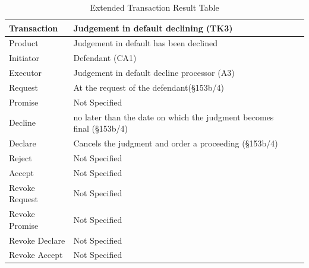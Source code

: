\begin{landscape}
\begin{table}[h]
\caption{Extended Transaction Result Table}
\label{tab:etrt}
\begin{tabular}{|l||l|l|}
\hline
Transaction  & Judgement in default declining (TK3)  \\ \hline
Product      & Judgement in default has been declined  \\ \hline
Initiator      &  Defendant (CA1)   \\ \hline
Executor       &  Judgement in default decline processor (A3) \\ \hline
Request        & At the request of the defendant(\S153b/4)   \\ \hline
Promise        &  Not Specified \\ \hline
Decline        &  no later than the date on which the judgment becomes final (\S153b/4) \\ \hline
Declare        & Cancels the judgment and order a proceeding (\S153b/4) \\ \hline
Reject         &  Not Specified   \\ \hline
Accept         & Not Specified \\ \hline
Revoke Request & Not Specified  \\ \hline
Revoke Promise & Not Specified  \\ \hline
Revoke Declare & Not Specified  \\ \hline
Revoke Accept  &  Not Specified  \\ \hline
\end{tabular}
\end{table}


\end{landscape}
